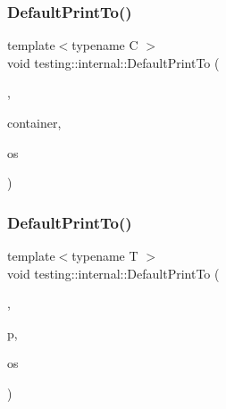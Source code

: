\mbox{\label{namespacetesting_1_1internal_a2e96c98d5bd8ee4a1b92f8e3cde7dd40}} 
\subsubsection{\texorpdfstring{DefaultPrintTo()}{DefaultPrintTo()}\hspace{0.1cm}{\footnotesize\ttfamily [1/4]}}
{\footnotesize\ttfamily template$<$typename C $>$ \\
void testing\+::internal\+::\+Default\+Print\+To (\begin{DoxyParamCaption}\item[{\mbox{\hyperlink{structtesting_1_1internal_1_1_wrap_printer_type}{Wrap\+Printer\+Type}}$<$ \mbox{\hyperlink{namespacetesting_1_1internal_a17fb8f0125fa92404a249ed38a43faa4a95fb0ba1da1e6dda57c8704bdfc28254}{k\+Print\+Container}} $>$}]{,  }\item[{const C \&}]{container,  }\item[{\+::std\+::ostream $\ast$}]{os }\end{DoxyParamCaption})}

\mbox{\label{namespacetesting_1_1internal_a074522dd8d77d61878a042b8d05cc64a}} 
\subsubsection{\texorpdfstring{DefaultPrintTo()}{DefaultPrintTo()}\hspace{0.1cm}{\footnotesize\ttfamily [2/4]}}
{\footnotesize\ttfamily template$<$typename T $>$ \\
void testing\+::internal\+::\+Default\+Print\+To (\begin{DoxyParamCaption}\item[{\mbox{\hyperlink{structtesting_1_1internal_1_1_wrap_printer_type}{Wrap\+Printer\+Type}}$<$ \mbox{\hyperlink{namespacetesting_1_1internal_a17fb8f0125fa92404a249ed38a43faa4a40e5978dd0766e19bfafca71837531e4}{k\+Print\+Pointer}} $>$}]{,  }\item[{T $\ast$}]{p,  }\item[{\+::std\+::ostream $\ast$}]{os }\end{DoxyParamCaption})}

